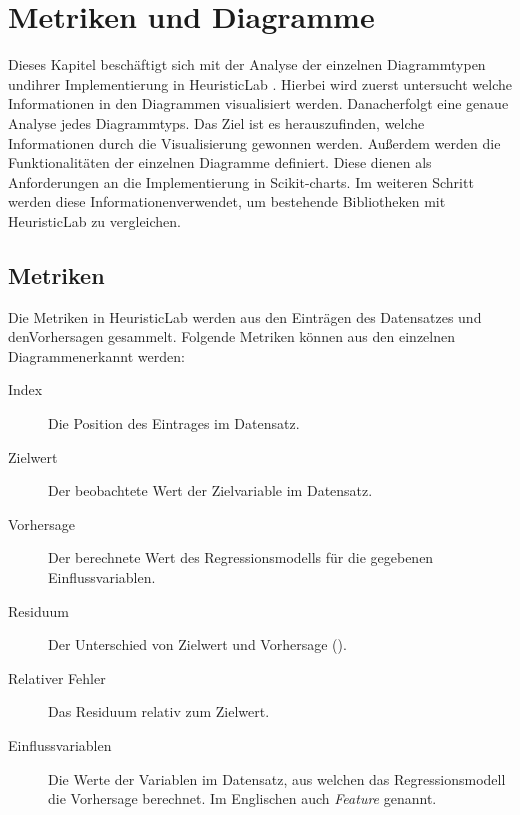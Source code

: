 \chapter{Metriken und Diagramme}
\label{cha:Metriken_Diagramme}


Dieses Kapitel beschäftigt sich mit der Analyse der einzelnen Diagrammtypen und\linebreak ihrer Implementierung in HeuristicLab \parencite{HeuristicLab}.
Hierbei wird zuerst untersucht welche Informationen in den Diagrammen visualisiert werden. Danach\linebreak erfolgt eine genaue Analyse jedes Diagrammtyps.
Das Ziel ist es herauszufinden, welche Informationen durch die Visualisierung gewonnen werden. Außerdem werden die Funktionalitäten der einzelnen Diagramme definiert. 
Diese dienen als Anforderungen an die Implementierung in Scikit-charts. Im weiteren Schritt werden diese Informationen\linebreak verwendet, um bestehende Bibliotheken mit HeuristicLab zu vergleichen.

\section{Metriken}
\label{cha:Metriken}

Die Metriken in HeuristicLab werden aus den Einträgen des Datensatzes und den\linebreak Vorhersagen gesammelt. Folgende Metriken können aus den einzelnen Diagrammen\linebreak erkannt werden:

\begin{description}
\item[Index] \hfill\newline
Die Position des Eintrages im Datensatz.
\item[Zielwert] \hfill\newline
Der beobachtete Wert der Zielvariable im Datensatz.
\item[Vorhersage] \hfill\newline
Der berechnete Wert des Regressionsmodells für die gegebenen Einflussvariablen.
\item[Residuum] \hfill\newline
Der Unterschied von Zielwert und Vorhersage (\cite{RegressionGrundlagen}).
\item[Relativer Fehler]  \hfill\newline
Das Residuum relativ zum Zielwert.
\item[Einflussvariablen] \hfill\newline %
Die Werte der Variablen im Datensatz, aus welchen das Regressionsmodell die Vorhersage berechnet. Im Englischen auch \textit{Feature} genannt.
\end{description}

